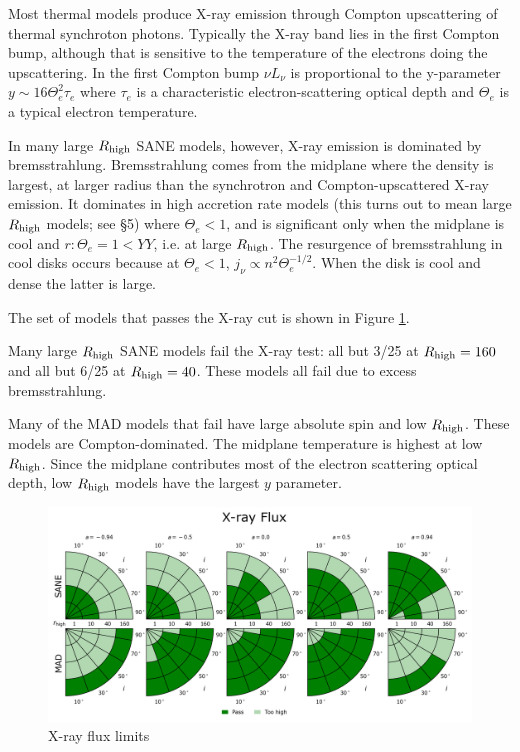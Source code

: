 

Most thermal models produce X-ray emission through Compton upscattering of thermal synchroton photons.  Typically the X-ray band lies in the first Compton bump, although that is sensitive to the temperature of the electrons doing the upscattering.  In the first Compton bump $\nu L_\nu$ is proportional to the y-parameter $y \sim 16 \Theta_e^2 \tau_e$ where $\tau_e$ is a characteristic electron-scattering optical depth and $\Theta_e$ is a typical electron temperature.

In many large $R_\mathrm{high}$ SANE models, however, X-ray emission is dominated by bremsstrahlung.  Bremsstrahlung comes from the midplane where the density is largest, at larger radius than the synchrotron and Compton-upscattered X-ray emission.  It dominates in high accretion rate models (this turns out to mean large $R_\mathrm{high}$ models; see \S 5) where $\Theta_e < 1$, and is significant only when the midplane is cool and $r: \Theta_e = 1 < YY$, i.e. at large $R_\mathrm{high}$.  The resurgence of bremsstrahlung in cool disks occurs because at $\Theta_e < 1$, $j_\nu \propto n^2 \Theta_e^{-1/2}$.  When the disk is cool and dense the latter is large.

The set of models that passes the X-ray cut is shown in Figure \ref{fig:cmp_xray_flux}.

Many large $R_\mathrm{high}$ SANE models fail the X-ray test: all but 3/25 at $R_\mathrm{high} = 160$ and all but 6/25 at $R_\mathrm{high} = 40$.  These models all fail due to excess bremsstrahlung.

Many of the MAD models that fail have large absolute spin and low $R_\mathrm{high}$.  These models are Compton-dominated.  The midplane temperature is highest at low $R_\mathrm{high}$.  Since the midplane contributes most of the electron scattering optical depth, low $R_\mathrm{high}$ models have the largest $y$ parameter.

\begin{figure}
  \centering
  \includegraphics[width=\columnwidth]{./figures/Xray_flux_Constraints.png}
  \caption{X-ray flux limits}
  \label{fig:cmp_xray_flux}
\end{figure}


